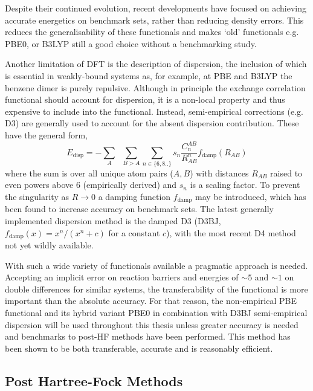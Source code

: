 \documentclass[main.tex]{subfiles}
\begin{document}
Despite their continued evolution, recent developments have focused on achieving accurate energetics on benchmark sets, rather than reducing density errors.\cite{Mardirossian2017}
This reduces the generalisability of these functionals and makes `old' functionals e.g. PBE0, or B3LYP still a good choice without a benchmarking study.\cite{Becke2014, Cohen2011}

Another limitation of DFT is the description of dispersion, the inclusion of which is essential in weakly-bound systems as, for example, at PBE and B3LYP the benzene dimer is purely repulsive.\cite{Puzder2006} Although in principle the exchange correlation functional should account for dispersion, it is a non-local property and thus expensive to include into the functional.\cite{GrimmeDisp2011} Instead, semi-empirical corrections (e.g. D3\cite{Grimme2010}) are generally used to account for the absent dispersion contribution. These have the general form,
\begin{equation}
	E_\text{disp} = -\sum_{A}\;\;\sum_{B>A}\sum_{n\in\{6, 8..\}} s_n\frac{C_n^{AB}}{R_{AB}^n} f_\text{damp}(R_{AB})
	\label{equation::dft_d}
\end{equation} 
where the sum is over all unique atom pairs ($A, B$) with distances $R_{AB}$ raised to even powers above 6 (empirically derived) and $s_n$ is a scaling factor. To prevent the singularity as $R\rightarrow0$ a damping function $f_\text{damp}$ may be introduced, which has been found to increase accuracy on benchmark sets.\cite{Mardirossian2017} The latest generally implemented dispersion method is the damped D3 (D3BJ, $f_\text{damp}(x) = x^n/(x^n + c)$ for a constant $c$),\cite{Becke2005, BJdamping} with the most recent D4 method not yet wildly available. 

With such a wide variety of functionals available a pragmatic approach is needed. Accepting an implicit error on reaction barriers and energies of $\sim 5$ \kcal\cite{Goerigk2011} and $\sim 1$ \kcalx on double differences for similar systems,\cite{Wheeler2009} the transferability of the functional is more important than the absolute accuracy. For that reason, the non-empirical PBE functional and its hybrid variant PBE0 in combination with D3BJ semi-empirical dispersion will be used throughout this thesis unless greater accuracy is needed and benchmarks to post-HF methods have been performed. This method has been shown to be both transferable, accurate and is reasonably efficient.\cite{Mardirossian2017}


\subsection{Post Hartree-Fock Methods}
\end{document}

